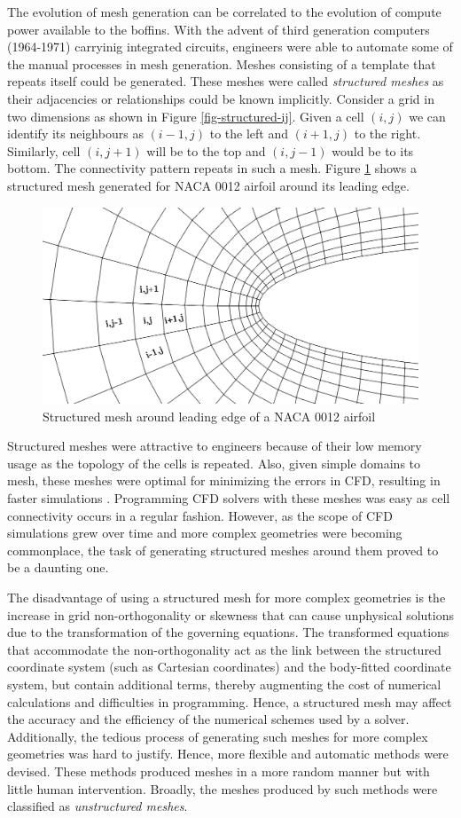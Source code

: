 The evolution of mesh generation can be correlated to the evolution of compute power available to the boffins. With the advent of third generation computers (1964-1971) carryinig integrated circuits, engineers were able to automate some of the manual processes in mesh generation. Meshes consisting of a template that repeats itself could be generated. These meshes were called \textit{structured meshes} as their adjacencies or relationships could be known implicitly. Consider a grid in two dimensions as shown in Figure \ref{fig-structured-ij}. Given a cell $(i,j)$ we can identify its neighbours as $(i-1, j)$ to the left and $(i+1, j)$ to the right. Similarly, cell $(i, j+1)$ will be to the top and $(i, j-1)$ would be to its bottom. The connectivity pattern repeats in such a mesh. Figure \ref{fig-structuredNaca0012} shows a structured mesh generated for NACA 0012 airfoil around its leading edge.

\begin{figure}
  \centering
  \includegraphics[width=0.6\linewidth]{img/intro/stucturedNaca0012.png}
  \caption{Structured mesh around leading edge of a NACA 0012 airfoil}
  \label{fig-structuredNaca0012}
\end{figure}


Structured meshes were attractive to engineers because of their low memory usage as the topology of the cells is repeated. Also, given simple domains to mesh, these meshes were optimal for minimizing the errors in CFD, resulting in faster simulations \cite{d1991optimal}. Programming CFD solvers with these meshes was easy as cell connectivity occurs in a regular fashion. However, as the scope of CFD simulations grew over time and more complex geometries were becoming commonplace, the task of generating structured meshes around them proved to be a daunting one. 

The disadvantage of using a structured mesh for more complex geometries is the increase in grid non-orthogonality or skewness that can cause unphysical solutions due to the transformation of the governing equations\cite{TU2013219}. The transformed equations that accommodate the non-orthogonality act as the link between the structured coordinate system (such as Cartesian coordinates) and the body-fitted coordinate system, but contain additional terms, thereby augmenting the cost of numerical calculations and difficulties in programming. Hence, a structured mesh may affect the accuracy and the efficiency of the numerical schemes used by a solver. Additionally, the tedious process of generating such meshes for more complex geometries was hard to justify. Hence, more flexible and automatic methods were devised. These methods produced meshes in a more random manner but with little human intervention. Broadly, the meshes produced by such methods were classified as \textit{unstructured meshes}.

